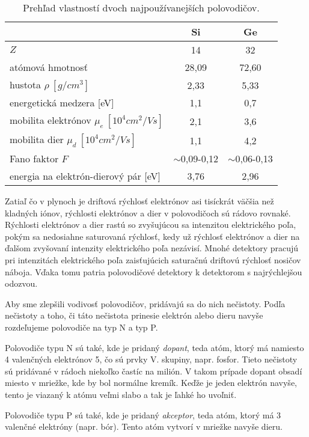 \documentclass[../../main.tex]{subfiles}
\begin{document}
\begin{table}[h]
\centering
\caption{Prehľad vlastností dvoch najpoužívanejších polovodičov.}
\begin{tabular}{|l c c|}
\hline
& Si & Ge \\ \hline
$Z$ & 14 & 32 \\
atómová hmotnosť & 28,09 & 72,60 \\
hustota $\rho\:[\unit{g/cm^3}]$ & 2,33 & 5,33 \\
energetická medzera [eV] & 1,1 & 0,7 \\
mobilita elektrónov $\mu_e\:[\unit{10^4cm^2/Vs}]$ & 2,1 & 3,6 \\
mobilita dier $\mu_d\:[\unit{10^4cm^2/Vs}]$ & 1,1 & 4,2 \\
Fano faktor $F$ & $\sim$0,09-0,12 & $\sim$0,06-0,13 \\
energia na elektrón-dierový pár [eV] & 3,76 & 2,96 \\ \hline
\end{tabular}
\label{js1:tab:polovodice}
\end{table}

Zatiaľ čo v plynoch je driftová rýchlosť elektrónov asi tisíckrát väčšia než kladných iónov, rýchlosti elektrónov a dier v polovodičoch sú rádovo rovnaké. Rýchlosti elektrónov a dier rastú so zvyšujúcou sa intenzitou elektrického poľa, pokým sa nedosiahne saturovaná rýchlosť, kedy už rýchlosť elektrónov a dier na ďalšom zvyšovaní intenzity elektrického poľa nezávisí. Mnohé detektory pracujú pri intenzitách elektrického poľa zaisťujúcich saturačnú driftovú rýchlosť nosičov náboja. Vďaka tomu patria polovodičové detektory k detektorom s najrýchlejšou odozvou.


Aby sme zlepšili vodivosť polovodičov, pridávajú sa do nich nečistoty. Podľa nečistoty a toho, či táto nečistota prinesie elektrón alebo dieru navyše rozdeľujeme polovodiče na typ N a typ P.

Polovodiče typu N sú také, kde je pridaný \textit{dopant}, teda atóm, ktorý má namiesto 4 valenčných elektrónov 5, čo sú prvky V. skupiny, napr. fosfor. Tieto nečistoty sú pridávané v rádoch niekoľko častíc na milión. V takom prípade dopant obsadí miesto v mriežke, kde by bol normálne kremík. Keďže je jeden elektrón navyše, tento je viazaný k atómu veľmi slabo a tak je ľahké ho uvoľniť.

Polovodiče typu P sú také, kde je pridaný \textit{akceptor}, teda atóm, ktorý má 3 valenčné elektróny (napr. bór). Tento atóm vytvorí v mriežke navyše dieru. 
\end{document}
